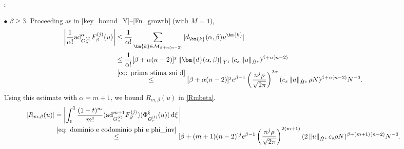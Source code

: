 \documentclass[a4paper,10pt,reqno]{article}
\theoremstyle{definition}
\theoremstyle{plain}
\theoremstyle{plain}
\theoremstyle{definition}
\theoremstyle{plain}
\theoremstyle{plain}
\theoremstyle{plain}
\theoremstyle{definition}
\theoremstyle{definition}
\newcommand{\norm}[1]{\left\lVert #1 \right\rVert}
\def \M{\mathcal{M}}
\def \k{\bm{k}}
\begin{document}

\medskip

:

\medskip 

\noindent $\bullet$ $\beta \ge 3$.
Proceeding as in \eqref{key_bound_Y}--\eqref{Fn_growth} (with $M=1$),
\begin{equation}\label{eq:est:ad_alpha_F_beta}
\begin{split}
\left \lvert \frac{1}{\alpha!} \mathrm{ad}_{G_n^{(l)}}^{\alpha} F_{\beta}^{(j)}(u) \right \rvert &\le \frac{1}{\alpha!} \sum_{\k \in \M_{\beta + \alpha (n-2)}} |d_{\k}(\alpha,\beta) u^{\k}| \\
&\le \frac{1}{\alpha!} [\beta + \alpha (n-2)]^j \norm{\bm{d}(\alpha,\beta)}_{Y^j} (c_s \norm{u}_{\dot{H}^s})^{\beta+\alpha (n-2)} \\
& \stackrel{\eqref{eq: prima stima sui d}}{\le} [\beta+\alpha (n-2)]^j e^{\beta-1} \left ( \frac{n^j \rho}{\sqrt{2\pi}} \right )^{2\alpha} (c_s \norm{u}_{\dot{H}^s} \rho N)^{\beta+\alpha(n-2)} N^{-3}. 
\end{split}
\end{equation}
Using this estimate with $\alpha=m+1$, we bound $R_{m,\beta}(u)$ in \eqref{Rmbeta}.
\[
\begin{split}
| R_{m,\beta}(u) | &= \left \lvert \int_0^1 \frac{(1-t)^m}{m!} ( \mathrm{ad}_{G_n^{(l)}}^{m+1} F_{\beta}^{(j)} )(\Phi_{G_r^{(l)}}^{\xi}(u)) \, \mathrm{d} \xi \right \rvert \\
&\stackrel{\eqref{eq: dominio e codominio phi e phi_inv}}{\le} [\beta + (m+1)(n-2)]^j e^{\beta-1} \left ( \frac{n^j \rho}{\sqrt{2\pi}} \right )^{2(m+1)} (2 \norm{u}_{\dot{H}^s} c_s \rho N)^{\beta+(m+1)(n-2)} N^{-3}. 
\end{split}
\]
\end{document}
